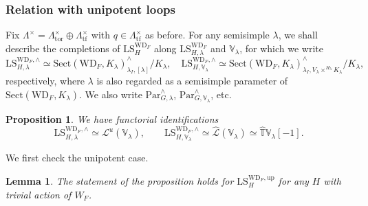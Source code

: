 \documentclass{amsart}
\newtheorem{lemma}[theorem]{Lemma}
\newtheorem{proposition}[theorem]{Proposition}
\theoremstyle{definition}
\theoremstyle{remark}
\numberwithin{equation}{section}
\newcommand{\mc}{\mathcal}
\newcommand{\wh}{\widehat}
\newcommand{\Par}{\mathrm{Par}}
\newcommand{\V}{\mathbb{V}}
\newcommand{\T}{\mathbb{T}}
\newcommand{\up}{\mathrm{up}}
\newcommand{\WD}{\mathrm{WD}}
\newcommand{\tor}{\mathrm{tor}}
\newcommand{\tf}{\mathrm{tf}}
\newcommand{\LS}{\mathrm{LS}}
\newcommand{\Sect}{\mathrm{Sect}}
\begin{document}
\subsubsection{Relation with unipotent loops}{\label{sss: relationuniploops}}
Fix $\Lambda^{\times} = \Lambda_{\tor}^{\times} \oplus \Lambda_{\tf}^{\times}$ with $q\in \Lambda_{\tf}^{\times}$ as before. For any semisimple $\lambda$, we shall describe the completions of $\LS^{\WD_F}_H$ along $\LS_{H,\lambda}^{\WD_F}$ and $\V_\lambda$, for which we write
\[
\LS_{H, \lambda}^{\WD_F, \wedge}\simeq \Sect(\WD_F, K_\lambda)^{\wedge}_{\lambda_I, [\lambda]}/ K_\lambda, \quad \LS_{H, \V_\lambda}^{\WD_F, \wedge}\simeq \Sect(\WD_F, K_\lambda)^{\wedge}_{\lambda_I, V_\lambda\times^{H_\lambda} K_\lambda}/ K_\lambda,
\]
respectively, where $\lambda$ is also regarded as a semisimple parameter of $\Sect (\WD_F, K_\lambda)$. We also write $\Par_{G,\lambda}^{\wedge}$, $\Par^{\wedge}_{G,\V_\lambda}$, etc.

\begin{proposition}\label{prop: LoopSpaceIdentificationCompletions}
We have functorial identifications
\begin{equation*}
        \LS^{\WD_F, \wedge}_{H, \lambda} \simeq \mc{L}^{u}(\V_{\lambda}), \qquad \LS^{\WD_F, \wedge}_{H, \V_{\lambda}} \simeq \wh{\mc{L}}(\V_{\lambda}) \simeq \wh{\T}\V_{\lambda}[-1].
\end{equation*}    
\end{proposition}

We first check the unipotent case. 

\begin{lemma}
The statement of the proposition holds for $\LS^{\WD_F, \up}_H$ for any $H$ with trivial action of $W_F$.   
\end{lemma}
\end{document}

